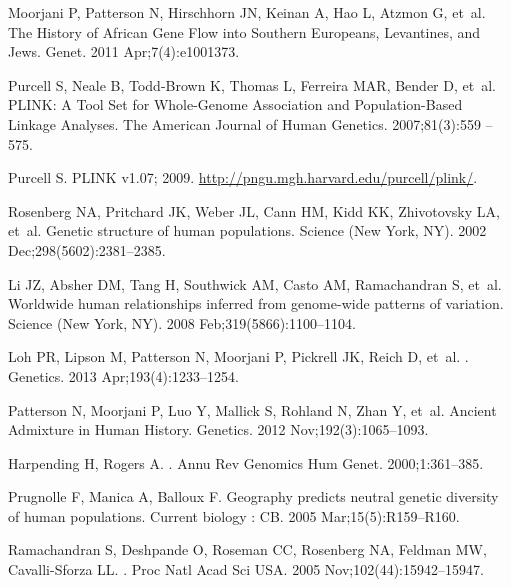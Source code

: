 \documentclass[10pt,letterpaper]{article}
\begin{document}
\begin{thebibliography}{80}
Moorjani P, Patterson N, Hirschhorn JN, Keinan A, Hao L, Atzmon G, et~al.
\newblock The History of {African} Gene Flow into Southern {Europeans,}
  {Levantines,} and {Jews}.
 Genet. 2011 Apr;7(4):e1001373.

Purcell S, Neale B, Todd-Brown K, Thomas L, Ferreira MAR, Bender D, et~al.
\newblock PLINK: A Tool Set for Whole-Genome Association and Population-Based
  Linkage Analyses.
\newblock The American Journal of Human Genetics. 2007;81(3):559 -- 575.

Purcell S. {PLINK v1.07}; 2009.
\newblock \url{http://pngu.mgh.harvard.edu/purcell/plink/}.

Rosenberg NA, Pritchard JK, Weber JL, Cann HM, Kidd KK, Zhivotovsky LA, et~al.
\newblock Genetic structure of human populations.
\newblock Science (New York, NY). 2002 Dec;298(5602):2381--2385.

Li JZ, Absher DM, Tang H, Southwick AM, Casto AM, Ramachandran S, et~al.
\newblock Worldwide human relationships inferred from genome-wide patterns of
  variation.
\newblock Science (New York, NY). 2008 Feb;319(5866):1100--1104.

Loh PR, Lipson M, Patterson N, Moorjani P, Pickrell JK, Reich D, et~al.
.
\newblock Genetics. 2013 Apr;193(4):1233--1254.

Patterson N, Moorjani P, Luo Y, Mallick S, Rohland N, Zhan Y, et~al.
\newblock Ancient Admixture in Human History.
\newblock Genetics. 2012 Nov;192(3):1065--1093.

Harpending H, Rogers A.
.
\newblock Annu Rev Genomics Hum Genet. 2000;1:361--385.

Prugnolle F, Manica A, Balloux F.
\newblock Geography predicts neutral genetic diversity of human populations.
\newblock Current biology : {CB}. 2005 Mar;15(5):R159--R160.

Ramachandran S, Deshpande O, Roseman CC, Rosenberg NA, Feldman MW,
  Cavalli-Sforza LL.
.
\newblock Proc Natl Acad Sci USA. 2005 Nov;102(44):15942--15947.


\end{thebibliography}
\end{document}

